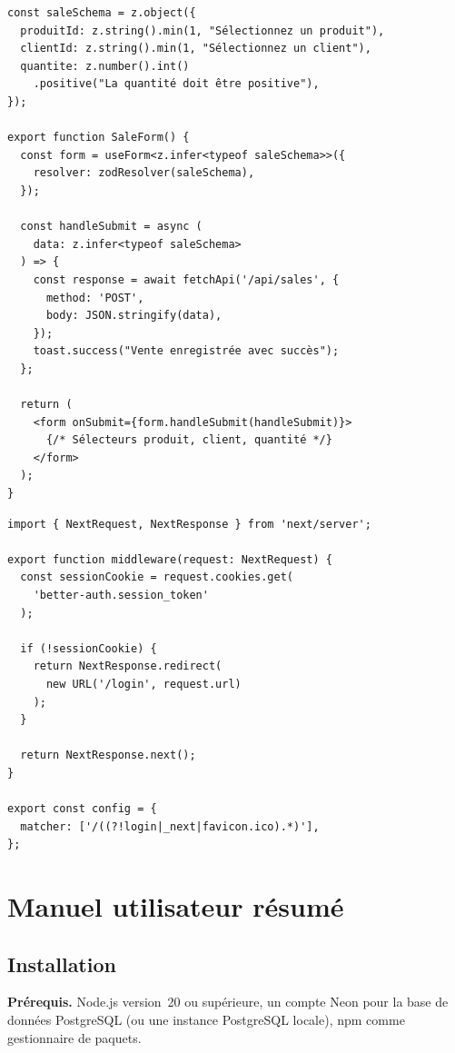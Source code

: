 \documentclass[11pt,a4paper]{report}
\begin{document}
\begin{lstlisting}[caption={Composant de formulaire de saisie (components/forms/SaleForm.tsx, extrait)},label={lst:saleform}]
const saleSchema = z.object({
  produitId: z.string().min(1, "Sélectionnez un produit"),
  clientId: z.string().min(1, "Sélectionnez un client"),
  quantite: z.number().int()
    .positive("La quantité doit être positive"),
});

export function SaleForm() {
  const form = useForm<z.infer<typeof saleSchema>>({
    resolver: zodResolver(saleSchema),
  });

  const handleSubmit = async (
    data: z.infer<typeof saleSchema>
  ) => {
    const response = await fetchApi('/api/sales', {
      method: 'POST',
      body: JSON.stringify(data),
    });
    toast.success("Vente enregistrée avec succès");
  };

  return (
    <form onSubmit={form.handleSubmit(handleSubmit)}>
      {/* Sélecteurs produit, client, quantité */}
    </form>
  );
}
\end{lstlisting}

\begin{lstlisting}[caption={Middleware Next.js de protection des routes (middleware.ts, extrait)},label={lst:mw-next}]
import { NextRequest, NextResponse } from 'next/server';

export function middleware(request: NextRequest) {
  const sessionCookie = request.cookies.get(
    'better-auth.session_token'
  );

  if (!sessionCookie) {
    return NextResponse.redirect(
      new URL('/login', request.url)
    );
  }

  return NextResponse.next();
}

export const config = {
  matcher: ['/((?!login|_next|favicon.ico).*)'],
};
\end{lstlisting}

\chapter{Manuel utilisateur résumé}

\section*{Installation}
\textbf{Prérequis.} Node.js version~20 ou supérieure, un compte Neon pour la base
de données PostgreSQL (ou une instance PostgreSQL locale), npm comme gestionnaire
de paquets.
\end{document}
